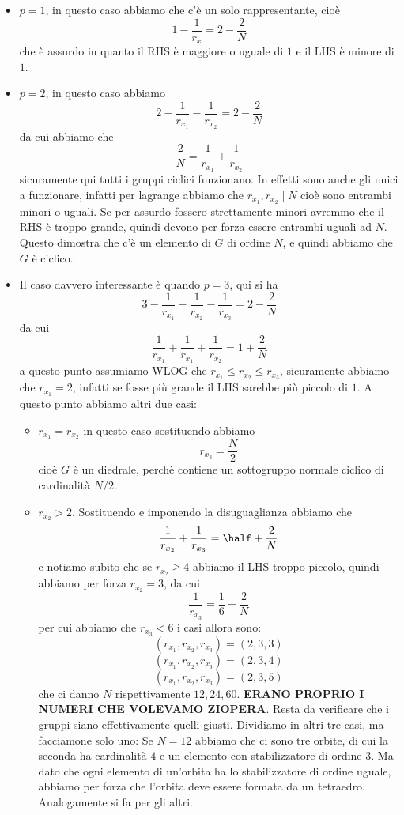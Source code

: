 \documentclass[11pt]{scrartcl}
\begin{document}
	\begin{itemize}
		\item $p=1$, in questo caso abbiamo che c'è un solo rappresentante, cioè
		$$1-\frac{1}{r_x}=2-\frac{2}{N}$$
		che è assurdo in quanto il RHS è maggiore o uguale di $1$ e il LHS è minore di $1$.
		\item $p=2$, in questo caso abbiamo
		$$2-\frac{1}{r_{x_1}}-\frac{1}{r_{x_2}}=2-\frac{2}{N}$$
		da cui abbiamo che 
		$$\frac{2}{N}=\frac{1}{r_{x_1}}+\frac{1}{r_{x_2}}$$
		sicuramente qui tutti i gruppi ciclici funzionano. In effetti sono anche gli unici a funzionare, infatti per lagrange abbiamo che $r_{x_1},r_{x_2}\mid N$ cioè sono entrambi minori o uguali. Se per assurdo fossero strettamente minori avremmo che il RHS è troppo grande, quindi devono per forza essere entrambi uguali ad $N$. Questo dimostra che c'è un elemento di $G$ di ordine $N$, e quindi abbiamo che $G$ è ciclico.
		\item Il caso davvero interessante è quando $p=3$, qui si ha
		$$3-\frac{1}{r_{x_1}}-\frac{1}{r_{x_2}}-\frac{1}{r_{x_3}}=2-\frac{2}{N}$$
		da cui
		$$\frac{1}{r_{x_1}}+\frac{1}{r_{x_1}}+\frac{1}{r_{x_2}}=1+\frac{2}{N}$$
		a questo punto assumiamo WLOG che $r_{x_1}\le r_{x_2}\le r_{x_3}$, sicuramente abbiamo che $r_{x_1}=2$, infatti se fosse più grande il LHS sarebbe più piccolo di $1$. A questo punto abbiamo altri due casi:
		\begin{itemize}
			\item $r_{x_1}=r_{x_2}$ in questo caso sostituendo abbiamo
			$$r_{x_3}=\frac{N}{2}$$
			cioè $G$ è un diedrale, perchè contiene un sottogruppo normale ciclico di cardinalità $N/2$.
			\item $r_{x_2}>2$. Sostituendo e imponendo la disuguaglianza abbiamo che
			$$\frac{1}{r_{x_2}}+\frac{1}{r_{x_3}}=\half +\frac{2}{N}$$
			e notiamo subito che se $r_{x_2}\ge 4 $ abbiamo il LHS troppo piccolo, quindi abbiamo per forza $r_{x_2}=3$, da cui 
			$$\frac{1}{r_{x_3}}=\frac{1}{6}+\frac{2}{N}$$
			per cui abbiamo che $r_{x_3}<6$ i casi allora sono:
			$$\left(r_{x_1},r_{x_2},r_{x_3}\right)=(2,3,3)$$
			$$\left(r_{x_1},r_{x_2},r_{x_3}\right)=(2,3,4)$$
			$$\left(r_{x_1},r_{x_2},r_{x_3}\right)=(2,3,5)$$
			che ci danno $N$ rispettivamente $12,24,60$. \textbf{ERANO PROPRIO I NUMERI CHE VOLEVAMO ZIOPERA}. Resta da verificare che i gruppi siano effettivamente quelli giusti. Dividiamo in altri tre casi, ma facciamone solo uno: 
			Se $N=12$ abbiamo che ci sono tre orbite, di cui la seconda ha cardinalità $4$ e un elemento con stabilizzatore di ordine $3$. Ma dato che ogni elemento di un'orbita ha lo stabilizzatore di ordine uguale, abbiamo per forza che l'orbita deve essere formata da un tetraedro. Analogamente si fa per gli altri.
		\end{itemize}
		
	\end{itemize}
	
\end{document}
